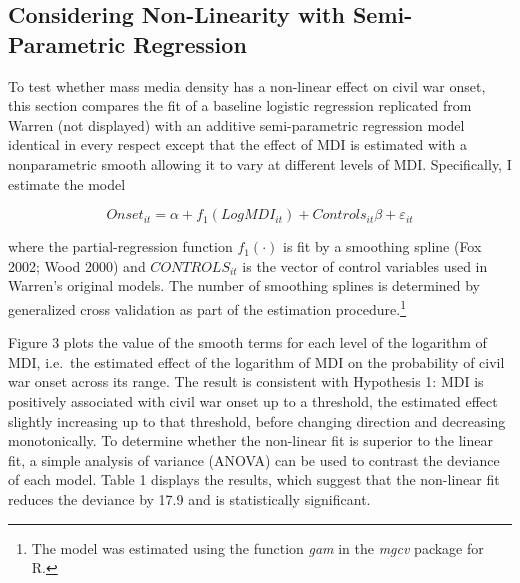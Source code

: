 \documentclass[11pt,article,oneside]{memoir}
\begin{document}
\subsection{Considering Non-Linearity with Semi-Parametric
Regression}\label{considering-non-linearity-with-semi-parametric-regression}

To test whether mass media density has a non-linear effect on civil war
onset, this section compares the fit of a baseline logistic regression
replicated from Warren (not displayed) with an additive semi-parametric
regression model identical in every respect except that the effect of
MDI is estimated with a nonparametric smooth allowing it to vary at
different levels of MDI. Specifically, I estimate the model

\[ Onset_{it} = \alpha + f_1 (LogMDI_{it}) + Controls_{it} \beta  + \varepsilon_{it} \]

where the partial-regression function $f_1 (\cdot)$ is fit by a
smoothing spline (Fox 2002; Wood 2000) and $CONTROLS_{it}$ is the vector
of control variables used in Warren's original models. The number of
smoothing splines is determined by generalized cross validation as part
of the estimation procedure.\footnote{The model was estimated using the
  function \emph{gam} in the \emph{mgcv} package for R.}

Figure 3 plots the value of the smooth terms for each level of the
logarithm of MDI, i.e.~the estimated effect of the logarithm of MDI on
the probability of civil war onset across its range. The result is
consistent with Hypothesis 1: MDI is positively associated with civil
war onset up to a threshold, the estimated effect slightly increasing up
to that threshold, before changing direction and decreasing
monotonically. To determine whether the non-linear fit is superior to
the linear fit, a simple analysis of variance (ANOVA) can be used to
contrast the deviance of each model. Table 1 displays the results, which
suggest that the non-linear fit reduces the deviance by 17.9 and is
statistically significant.
\end{document}
